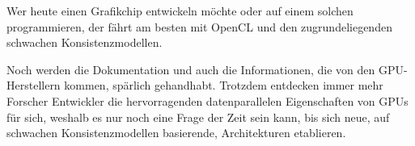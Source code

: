 \documentclass[final,bibliography=totocnumbered]{include/sikseminar}
\begin{document}
Wer heute einen Grafikchip entwickeln möchte oder auf einem solchen programmieren, der fährt am besten mit OpenCL und den zugrundeliegenden schwachen Konsistenzmodellen.

Noch werden die Dokumentation und auch die Informationen, die von den GPU-Herstellern kommen, spärlich gehandhabt.
 Trotzdem entdecken immer mehr Forscher Entwickler die hervorragenden datenparallelen Eigenschaften von GPUs für sich, weshalb es nur noch eine Frage der Zeit sein kann, bis sich neue, auf schwachen Konsistenzmodellen basierende, Architekturen etablieren.  



\newpage



\nocite{*}

\printbibliography
\end{document}
